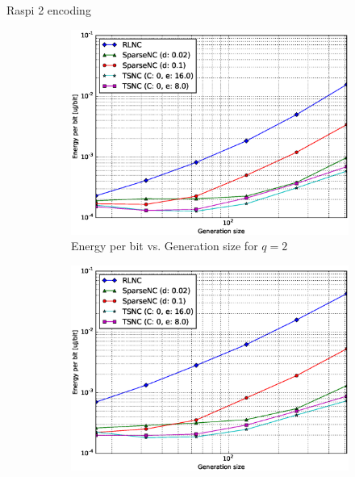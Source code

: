 Raspi 2 encoding

\begin{figure}
    \centering
    \begin{subfigure}[b]{0.475\textwidth}
        \centering
        \includegraphics[width=1.1\textwidth]{images/06_06_2016/energy_per_bit_vs_generation_size_Rasp_v2_Binary_encoder_1600.eps}
        \caption[]%
        {{\small Energy per bit vs. Generation size for $q = 2$}}
        \label{fig:enc_ene_rasp2_gen_gf2}
    \end{subfigure}
    \hfill
    \begin{subfigure}[b]{0.475\textwidth}
        \centering
        \includegraphics[width=1.1\textwidth]{images/06_06_2016/energy_per_bit_vs_generation_size_Rasp_v2_Binary8_encoder_1600.eps}

\end{subfigure}
\end{figure}
